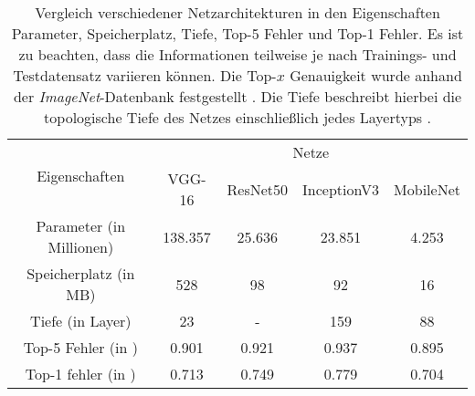 \begin{table}[H]
	\caption{Vergleich verschiedener Netzarchitekturen in den Eigenschaften Parameter, Speicherplatz, Tiefe, Top-5 Fehler und Top-1 Fehler. Es ist zu beachten, dass die Informationen teilweise je nach Trainings- und Testdatensatz variieren können. Die Top-$x$ Genauigkeit wurde anhand der \textit{ImageNet}-Datenbank festgestellt \cite{keras}. Die Tiefe beschreibt hierbei die topologische Tiefe des Netzes einschließlich jedes Layertyps \cite{keras}.}
	\begin{center}
		\begin{tabular}{|c|c|c|c|c|}
			\hline
			\multirow{2}{*}{Eigenschaften}& \multicolumn{4}{c|}{\centering Netze} \\
			\cline{2-5} & \multicolumn{1}{c|}{VGG-16} & \multicolumn{1}{c|}{ResNet50} & \multicolumn{1}{c|}{InceptionV3} & \multicolumn{1}{c|}{MobileNet} \\ \hline
			Parameter (in Millionen)	& 138.357 	& 25.636 	& 23.851 	& 4.253 \\
			Speicherplatz (in MB)		& 528 		& 98 		& 92 		& 16 \\
			Tiefe (in Layer) 			& 23 		& -			& 159 		& 88 \\
			Top-5 Fehler (in \percent)	& 0.901 	& 0.921 	& 0.937		& 0.895 \\
			Top-1 fehler (in \percent) 	& 0.713 	& 0.749 	& 0.779		& 0.704 \\
			\hline
		\end{tabular}
	\end{center}

	\label{fig: cnnvergleich}
\end{table}